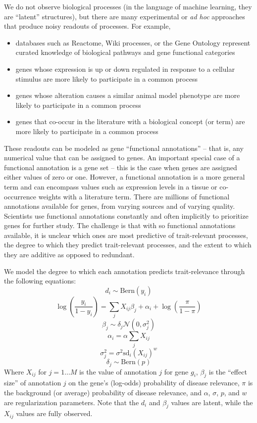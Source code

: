 \documentclass[11pt]{article}
\begin{document}
We do not observe biological processes (in the language of machine
learning, they are ``latent'' structures), but there are many
experimental or \textit{ad hoc} approaches that produce noisy readouts of
processes. For example,
\begin{itemize}
  \item databases such as Reactome\cite{},
Wiki processes\cite{}, or the Gene Ontology\cite{} represent curated
knowledge of biological pathways and gene functional categories
  \item genes whose expression is up or down regulated in response to a cellular stimulus
    are more likely to participate in a common process
  \item genes whose alteration causes a similar animal model phenotype
    are more likely to participate in a common process
  \item genes that co-occur in the literature with a biological
    concept (or term) are more likely to participate in a common process
\end{itemize}
These readouts can be modeled as gene ``functional annotations'' --
that is, any numerical value that can be assigned to genes. An
important special case of a functional annotation is a gene set --
this is the case when genes are assigned either values of zero or
one. However, a functional annotation is a more general term and can
encompass values such as expression levels in a tissue or co-occurrence
weights with a literature term. There are millions of functional
annotations available for genes\cite{}, from varying sources and of
varying quality. Scientists use functional annotations constantly and often
implicitly to prioritize genes for further study. The challenge is
that with so functional annotations available, it is unclear which
ones are most predictive of trait-relevant processes, the degree to
which they predict trait-relevant processes, and the extent to which
they are additive as opposed to redundant.

We model the degree to which each annotation predicts trait-relevance
through the following equations:
\[ d_i \sim \text{Bern}\left(y_i\right) \]
\[ \log(\frac{y_i}{1-y_i}) = \sum_jX_{ij}\beta_j + \alpha_i +
\log\left(\frac{\pi}{1-\pi}\right) \]
\[ \beta_j \sim \delta_j{\mathcal N}\left(0, \sigma_j^2\right) \]
\[ \alpha_i = \alpha \sum_jX_{ij}\]
\[ \sigma_j^2 = \sigma^2 \mathrm{sd}_i\left(X_{ij}\right)^{w}\]
\[ \delta_j \sim \text{Bern}(p) \]
Where $X_{ij}$ for $j=1\ldots M$ is the value of annotation $j$ for gene $g_i$, $\beta_j$
is the ``effect size'' of annotation $j$ on the gene's (log-odds)
probability of disease relevance, $\pi$ is the background (or average) probability
of disease relevance, and $\alpha$, $\sigma$, $p$, and $w$
are regularization parameters. Note that the $d_i$ and $\beta_j$
values are latent, while the $X_{ij}$ values are fully observed.
\end{document}
